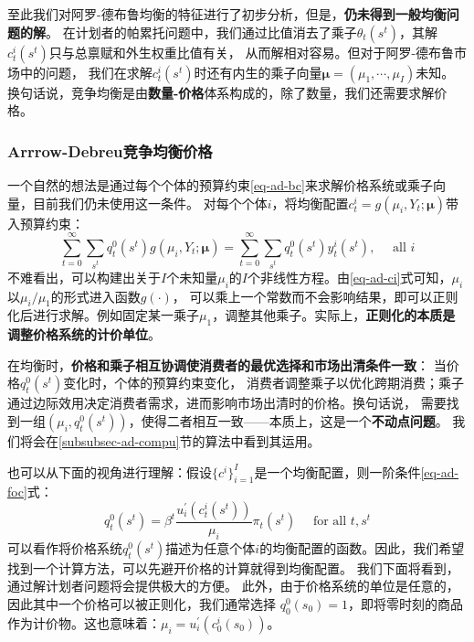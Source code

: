 至此我们对阿罗-德布鲁均衡的特征进行了初步分析，但是，\textbf{仍未得到一般均衡问题的解}。
在计划者的帕累托问题中，我们通过比值消去了乘子$\theta_t\left(s^t\right)$，其解$c_t^i\left(s^t\right)$只与总禀赋和外生权重比值有关，
从而解相对容易。但对于阿罗-德布鲁市场中的问题，
我们在求解$c_t^i\left(s^t\right)$时还有内生的乘子向量$\boldsymbol{\mu}=(\mu_1,\cdots,\mu_I)$未知。
换句话说，竞争均衡是由\textbf{数量-价格}体系构成的，除了数量，我们还需要求解价格。


\subsubsection{Arrrow-Debreu竞争均衡价格}    \label{subsubsec-ad-price}

一个自然的想法是通过每个个体的预算约束\ref{eq-ad-bc}来求解价格系统或乘子向量，目前我们仍未使用这一条件。
对每个个体$i$，将均衡配置$c_t^i=g\left(\mu_i, Y_t ; \boldsymbol{\mu}\right)$带入预算约束：
\begin{equation*}
    \sum_{t=0}^{\infty} \sum_{s^t} q_t^0\left(s^t\right) g\left(\mu_i, Y_t ; \boldsymbol{\mu}\right)
        =\sum_{t=0}^{\infty} \sum_{s^t} q_t^0\left(s^t\right) y_t^i\left(s^t\right), \quad \text { all } i
\end{equation*}
不难看出，可以构建出关于$I$个未知量$\mu_i$的$I$个非线性方程。由\ref{eq-ad-ci}式可知，$\mu_i$以$\mu_i/\mu_1$的形式进入函数$g(\cdot)$，
可以乘上一个常数而不会影响结果，即可以正则化后进行求解。例如固定某一乘子$\mu_1$，调整其他乘子。实际上，\textbf{正则化的本质是调整价格系统的计价单位}。

在均衡时，\textbf{价格和乘子相互协调使消费者的最优选择和市场出清条件一致}：
当价格$q_t^0\left(s^t\right)$变化时，个体的预算约束变化，
消费者调整乘子以优化跨期消费；乘子通过边际效用决定消费者需求，进而影响市场出清时的价格。换句话说，
需要找到一组$\left(\mu_i, q_t^0\left(s^t\right)\right)$，使得二者相互一致——本质上，这是一个\textbf{不动点问题}。
我们将会在\ref{subsubsec-ad-compu}节的算法中看到其运用。

也可以从下面的视角进行理解：假设$\{c^i\}_{i=1}^{I}$是一个均衡配置，则一阶条件\ref{eq-ad-foc}式：
\begin{equation*} 
    q_t^0\left(s^t\right) = \beta^t \frac{u_i^{\prime}\left(c_t^i\left(s^t\right)\right)}{\mu_i} \pi_t\left(s^t\right)
    \quad \text { for all } t, s^t
\end{equation*}
可以看作将价格系统$q_t^0\left(s^t\right)$描述为任意个体$i$的均衡配置的函数。因此，我们希望找到一个计算方法，可以先避开价格的计算就得到均衡配置。
我们下面将看到，通过解计划者问题将会提供极大的方便。
此外，由于价格系统的单位是任意的，因此其中一个价格可以被正则化，我们通常选择
$q_0^0\left(s_0\right)=1$，即将零时刻的商品作为计价物。这也意味着：$\mu_i = u_i^{\prime}\left(c_0^i\left(s_0\right)\right)$。



